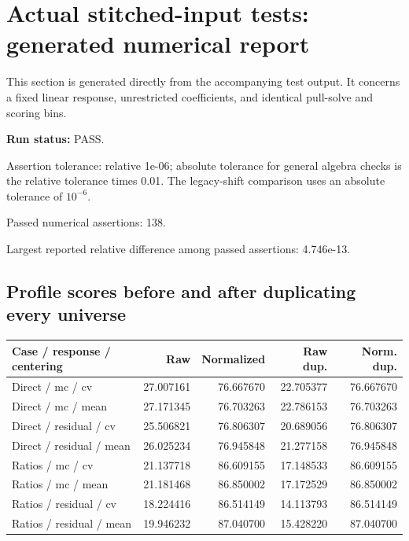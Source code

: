 \section{Actual stitched-input tests: generated numerical report}

This section is generated directly from the accompanying test output. It concerns a fixed linear response, unrestricted coefficients, and identical pull-solve and scoring bins.

\par\medskip\noindent\textbf{Run status:} PASS.

\par\noindent Assertion tolerance: relative 1e-06; absolute tolerance for general algebra checks is the relative tolerance times 0.01. The legacy-shift comparison uses an absolute tolerance of $10^{-6}$.

\par\noindent Passed numerical assertions: 138.

Largest reported relative difference among passed assertions: 4.746e-13.

\subsection{Profile scores before and after duplicating every universe}

\begin{center}\small

\begin{tabular}{lrrrr}

\toprule

Case / response / centering & Raw & Normalized & Raw dup. & Norm. dup.\\

\midrule

Direct / mc / cv & 27.007161 & 76.667670 & 22.705377 & 76.667670\\

Direct / mc / mean & 27.171345 & 76.703263 & 22.786153 & 76.703263\\

Direct / residual / cv & 25.506821 & 76.806307 & 20.689056 & 76.806307\\

Direct / residual / mean & 26.025234 & 76.945848 & 21.277158 & 76.945848\\

Ratios / mc / cv & 21.137718 & 86.609155 & 17.148533 & 86.609155\\

Ratios / mc / mean & 21.181468 & 86.850002 & 17.172529 & 86.850002\\

Ratios / residual / cv & 18.224416 & 86.514149 & 14.113793 & 86.514149\\

Ratios / residual / mean & 19.946232 & 87.040700 & 15.428220 & 87.040700\\

\bottomrule\end{tabular}\end{center}

